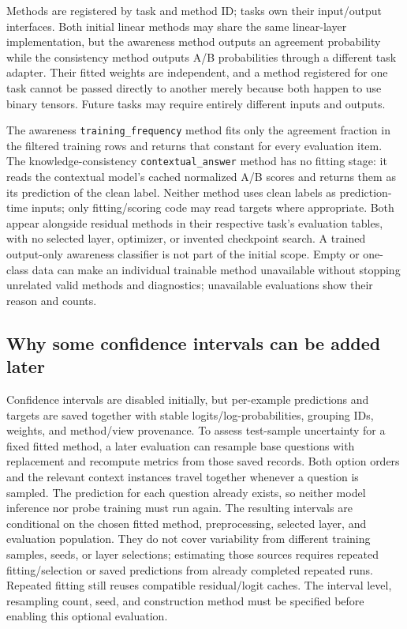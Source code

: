 \documentclass[11pt]{article}
\begin{document}
Methods are registered by task and method ID; tasks own their input/output interfaces.
Both initial linear methods may share the same linear-layer implementation, but the awareness method outputs an agreement probability while the consistency method outputs A/B probabilities through a different task adapter.
Their fitted weights are independent, and a method registered for one task cannot be passed directly to another merely because both happen to use binary tensors.
Future tasks may require entirely different inputs and outputs.

The awareness \texttt{training\_frequency} method fits only the agreement fraction in the filtered training rows and returns that constant for every evaluation item.
The knowledge-consistency \texttt{contextual\_answer} method has no fitting stage: it reads the contextual model's cached normalized A/B scores and returns them as its prediction of the clean label.
Neither method uses clean labels as prediction-time inputs; only fitting/scoring code may read targets where appropriate.
Both appear alongside residual methods in their respective task's evaluation tables, with no selected layer, optimizer, or invented checkpoint search.
A trained output-only awareness classifier is not part of the initial scope.
Empty or one-class data can make an individual trainable method unavailable without stopping unrelated valid methods and diagnostics; unavailable evaluations show their reason and counts.

\subsection*{Why some confidence intervals can be added later}

Confidence intervals are disabled initially, but per-example predictions and targets are saved together with stable logits/log-probabilities, grouping IDs, weights, and method/view provenance.
To assess test-sample uncertainty for a fixed fitted method, a later evaluation can resample base questions with replacement and recompute metrics from those saved records.
Both option orders and the relevant context instances travel together whenever a question is sampled.
The prediction for each question already exists, so neither model inference nor probe training must run again.
The resulting intervals are conditional on the chosen fitted method, preprocessing, selected layer, and evaluation population.
They do not cover variability from different training samples, seeds, or layer selections; estimating those sources requires repeated fitting/selection or saved predictions from already completed repeated runs.
Repeated fitting still reuses compatible residual/logit caches.
The interval level, resampling count, seed, and construction method must be specified before enabling this optional evaluation.
\end{document}
